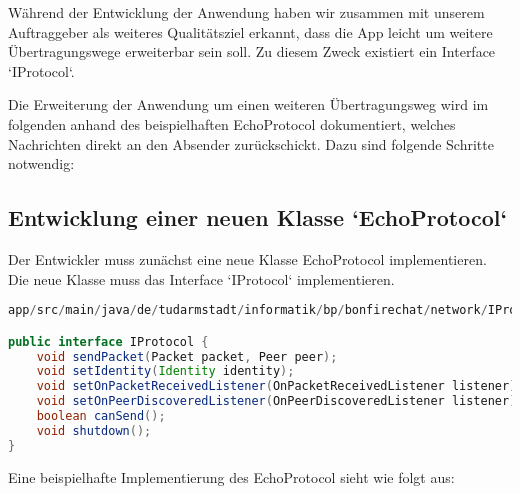 
Während der Entwicklung der Anwendung haben wir zusammen mit unserem Auftraggeber als weiteres Qualitätsziel erkannt, dass die App leicht um weitere Übertragungswege erweiterbar sein soll. Zu diesem Zweck existiert ein Interface `IProtocol`.

Die Erweiterung der Anwendung um einen weiteren Übertragungsweg wird im folgenden anhand des beispielhaften EchoProtocol dokumentiert, welches Nachrichten direkt an den Absender zurückschickt. Dazu sind folgende Schritte notwendig:

\subsection{Entwicklung einer neuen Klasse `EchoProtocol`}

Der Entwickler muss zunächst eine neue Klasse EchoProtocol implementieren. Die neue Klasse muss das Interface `IProtocol` implementieren.

\begin{lstlisting}[language=Java]
app/src/main/java/de/tudarmstadt/informatik/bp/bonfirechat/network/IProtocol.java

public interface IProtocol {
    void sendPacket(Packet packet, Peer peer);
    void setIdentity(Identity identity);
    void setOnPacketReceivedListener(OnPacketReceivedListener listener);
    void setOnPeerDiscoveredListener(OnPeerDiscoveredListener listener);
    boolean canSend();
    void shutdown();
}
\end{lstlisting}

Eine beispielhafte Implementierung des EchoProtocol sieht wie folgt aus:

